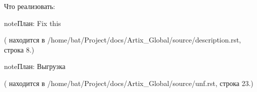 \documentclass[letterpaper,10pt,russian]{sphinxmanual}
\begin{document}
\sphinxAtStartPar
Что реализовать:

\begin{sphinxadmonition}{note}{План:}
\sphinxAtStartPar
Fix this
\end{sphinxadmonition}

\sphinxAtStartPar
({\hyperref[\detokenize{description:id2}]{}} находится в /home/bat/Project/docs/Artix\_Global/source/description.rst, строка 8.)

\begin{sphinxadmonition}{note}{План:}
\sphinxAtStartPar
Выгрузка
\end{sphinxadmonition}

\sphinxAtStartPar
({\hyperref[\detokenize{unf:id2}]{}} находится в /home/bat/Project/docs/Artix\_Global/source/unf.rst, строка 23.)



\renewcommand{\indexname}{Алфавитный указатель}
\printindex
\end{document}
